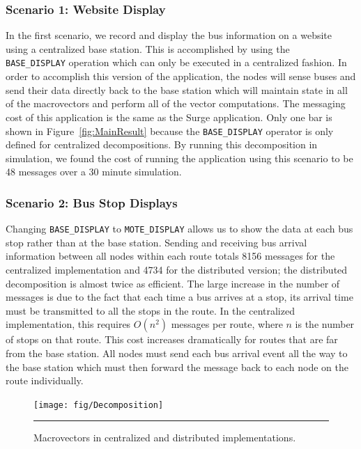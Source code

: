 \subsubsection{Scenario 1: Website Display} 

In the first scenario, we record and display the bus information on a website
using a centralized base station.  This is accomplished by using the {\tt
  BASE\_DISPLAY} operation which can only be executed in a centralized fashion.
In order to accomplish this version of the application, the nodes will sense
buses and send their data directly back to the base station which will maintain
state in all of the macrovectors and perform all of the vector computations.
The messaging cost of this application is the same as the Surge
application.  Only one bar is shown in Figure~\ref{fig:MainResult} because the
{\tt BASE\_DISPLAY} operator is only defined for centralized decompositions.  By
running this decomposition in simulation, we found the cost of running the
application using this scenario to be 48 messages over a 30 minute simulation.

\subsubsection{Scenario 2: Bus Stop Displays} 

Changing {\tt BASE\_DISPLAY} to {\tt MOTE\_DISPLAY} allows us
to show the data at each bus stop rather than at the base station. Sending
and receiving bus arrival information between all nodes within each route totals
8156 messages for the centralized implementation and 4734 for the distributed
version; the distributed decomposition is almost twice as efficient.  The large
increase in the number of messages is due to the fact that each time a bus arrives at a stop,
its arrival time must be transmitted to all the stops in the route. In the
centralized implementation, this requires $O(n^2)$ messages per route, where $n$
is the number of stops on that route. This cost increases dramatically for
routes that are far from the base station. All nodes must send each bus arrival
event all the way to the base station which must then forward the message back
to each node on the route individually.

\begin{figure}
  \centering
  \texttt{[image: fig/Decomposition]}
  \smallskip
  \hrule
  \caption{Macrovectors in centralized and distributed implementations.}
  \label{fig:Decomposition}
\end{figure}


